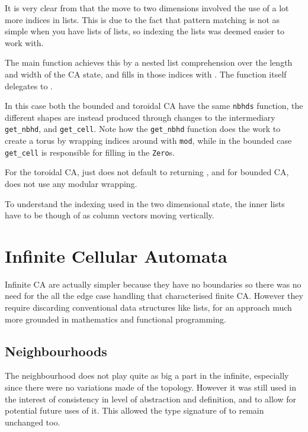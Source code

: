 It is very clear from  that the move to two dimensions involved the use of a lot more indices in lists.
This is due to the fact that pattern matching is not as simple when you have lists of lists,
so indexing the lists was deemed easier to work with.

The main  function achieves this by a nested list comprehension over the length and width of the CA state,
and fills in those indices with .
The function  itself delegates to .

In this case both the bounded and toroidal CA have the same \texttt{nbhds} function,
the different shapes are instead produced through changes to the intermediary \texttt{get_nbhd}, 
and \texttt{get_cell}.
Note how the \texttt{get_nbhd} function does the work to create a torus by wrapping indices around with \texttt{mod},
while in the bounded case \texttt{get_cell} is responsible for filling in the \texttt{Zero}s.

For the toroidal CA,  just does not default to returning ,
and for bounded CA,
 does not use any modular wrapping.

To understand the indexing used in the two dimensional state,
the inner lists have to be though of as column vectors moving vertically. %


\section{Infinite Cellular Automata}

Infinite CA are actually simpler because they have no boundaries so there was no need for the all the edge case handling that characterised finite CA.
However they require discarding conventional data structures like lists,
for an approach much more grounded in mathematics and functional programming.


\subsection{Neighbourhoods}

The neighbourhood does not play quite as big a part in the infinite,
especially since there were no variations made of the topology.
However it was still used in the interest of consistency in level of abstraction and definition,
and to allow for potential future uses of it.
This allowed the type signature of  to remain unchanged too.


